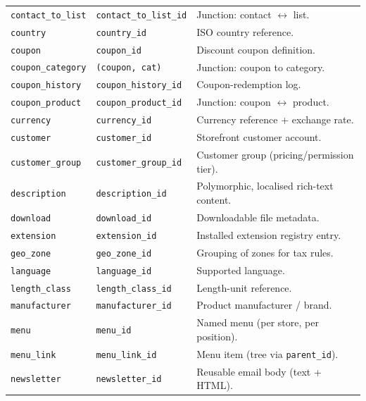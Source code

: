 \documentclass[11pt,a4paper]{article}
\begin{document}
\begin{longtable}{>{\raggedright\arraybackslash}p{4.7cm}>{\raggedright\arraybackslash}p{3.4cm}>{\raggedright\arraybackslash}p{6.3cm}}
\texttt{contact\_to\_list}       & \texttt{contact\_to\_list\_id} & Junction: contact $\leftrightarrow$ list. \\
\texttt{country}                 & \texttt{country\_id}        & ISO country reference. \\
\texttt{coupon}                  & \texttt{coupon\_id}         & Discount coupon definition. \\
\texttt{coupon\_category}        & \texttt{(coupon, cat)} & Junction: coupon to category. \\
\texttt{coupon\_history}         & \texttt{coupon\_history\_id} & Coupon-redemption log. \\
\texttt{coupon\_product}         & \texttt{coupon\_product\_id} & Junction: coupon $\leftrightarrow$ product. \\
\texttt{currency}                & \texttt{currency\_id}       & Currency reference + exchange rate. \\
\texttt{customer}                & \texttt{customer\_id}       & Storefront customer account. \\
\texttt{customer\_group}         & \texttt{customer\_group\_id} & Customer group (pricing/permission tier). \\
\texttt{description}             & \texttt{description\_id}    & Polymorphic, localised rich-text content. \\
\texttt{download}                & \texttt{download\_id}       & Downloadable file metadata. \\
\texttt{extension}               & \texttt{extension\_id}      & Installed extension registry entry. \\
\texttt{geo\_zone}               & \texttt{geo\_zone\_id}      & Grouping of zones for tax rules. \\
\texttt{language}                & \texttt{language\_id}       & Supported language. \\
\texttt{length\_class}           & \texttt{length\_class\_id}  & Length-unit reference. \\
\texttt{manufacturer}            & \texttt{manufacturer\_id}   & Product manufacturer / brand. \\
\texttt{menu}                    & \texttt{menu\_id}           & Named menu (per store, per position). \\
\texttt{menu\_link}              & \texttt{menu\_link\_id}     & Menu item (tree via \texttt{parent\_id}). \\
\texttt{newsletter}              & \texttt{newsletter\_id}     & Reusable email body (text + HTML). \\

\end{longtable}
\end{document}
